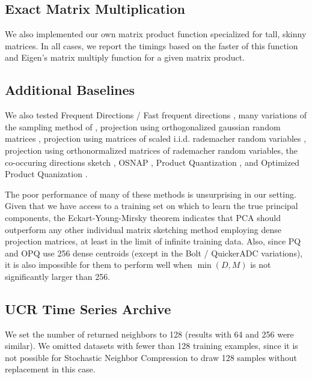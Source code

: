 \subsection{Exact Matrix Multiplication}

We also implemented our own matrix product function specialized for tall, skinny matrices. In all cases, we report the timings based on the faster of this function and Eigen's \cite{eigen} matrix multiply function for a given matrix product.

\subsection{Additional Baselines}

We also tested Frequent Directions / Fast frequent directions \cite{liberty_simple_2012, ghashami_frequent_2016, isvd}, many variations of the sampling method of \cite{drineas_fast_2006}, projection using orthogonalized gaussian random matrices \cite{superbitLSH}, projection using matrices of scaled i.i.d. rademacher random variables \cite{rademacherJL}, projection using orthonormalized matrices of rademacher random variables, the co-occuring directions sketch \cite{mroueh_co-occuring_2016}, OSNAP \cite{osnap}, Product Quantization \cite{pq}, and Optimized Product Quanization \cite{opq}.

The poor performance of many of these methods is unsurprising in our setting. Given that we have access to a training set on which to learn the true principal components, the Eckart-Young-Mirsky theorem \cite{eckartYoungMirskyThm} indicates that PCA should outperform any other individual matrix sketching method employing dense projection matrices, at least in the limit of infinite training data. Also, since PQ and OPQ use 256 dense centroids (except in the Bolt / QuickerADC variations), it is also impossible for them to perform well when $\min(D, M)$ is not significantly larger than 256.

\subsection{UCR Time Series Archive}

We set the number of returned neighbors to 128 (results with 64 and 256 were similar). We omitted datasets with fewer than 128 training examples, since it is not possible for Stochastic Neighbor Compression to draw 128 samples without replacement in this case.

